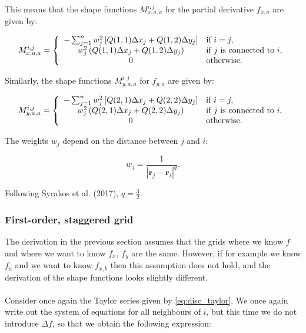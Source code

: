 \documentclass{article}
\begin{document}
This means that the shape functions $M_{x,a,a}^{i,j}$ for the partial derivative $f_{x,a}$ are given by:

\begin{equation}
M_{x,a,a}^{i,j} = \left\{
\begin{array}{ c l }
-\sum_{j=1}^n w_j^2 \left[ Q(1,1) \Delta x_j + Q(1,2) \Delta y_j \right] & \textrm{if } i = j, \\
w_j^2 \left( Q(1,1) \Delta x_j + Q(1,2) \Delta y_j \right) & \textrm{if } j \textrm{ is connected to } i, \\
0 & \textrm{otherwise}.
\end{array}
\right.
\end{equation}

Similarly, the shape functions $M_{y,a,a}^{i,j}$ for $f_{y,a}$ are given by:

\begin{equation}
M_{y,a,a}^{i,j} = \left\{
\begin{array}{ c l }
-\sum_{j=1}^n w_j^2 \left[ Q(2,1) \Delta x_j + Q(2,2) \Delta y_j \right] & \textrm{if } i = j, \\
w_j^2 \left( Q(2,1) \Delta x_j + Q(2,2) \Delta y_j \right) & \textrm{if } j \textrm{ is connected to } i, \\
0 & \textrm{otherwise}.
\end{array}
\right.
\end{equation}

The weights $w_j$ depend on the distance between $j$ and $i$:

\begin{equation}
w_j = \frac{1}{ \left| \textbf{r}_j - \textbf{r}_i \right|^q}.
\end{equation}

Following Syrakos et al. (2017), $q = \frac32$.

\subsubsection{First-order, staggered grid}

The derivation in the previous section assumes that the grids where we know $f$ and where we want to know $f_x$, $f_y$ are the same. However, if for example we know $f_a$ and we want to know $f_{x,b}$ then this assumption does not hold, and the derivation of the shape functions looks slightly different.\\
\\
Consider once again the Taylor series given by \eqref{eq:disc_taylor}. We once again write out the system of equations for all neighbours of $i$, but this time we do not introduce $\Delta f$, so that we obtain the following expression:
\end{document}
